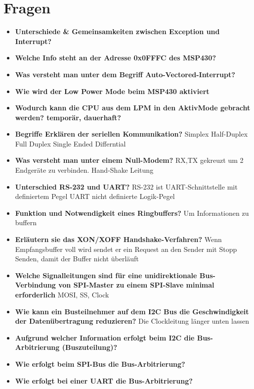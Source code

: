 \section{Fragen}
\begin{itemize}
	\item \textbf{Unterschiede \& Gemeinsamkeiten zwischen Exception und Interrupt?}
	
	\item \textbf{Welche Info steht an der Adresse 0x0FFFC des MSP430?}
	
	\item \textbf{Was versteht man unter dem Begriff Auto-Vectored-Interrupt?}
	
	\item \textbf{Wie wird der Low Power Mode beim MSP430 aktiviert}
	
	\item \textbf{Wodurch kann die CPU aus dem LPM in den AktivMode gebracht werden? temporär, dauerhaft?}
	
	\item \textbf{Begriffe Erklären der seriellen Kommunikation?}
	\subitem Simplex
	\subitem Half-Duplex
	\subitem Full Duplex
	\subitem Single Ended
	\subitem Differntial
	
	\item \textbf{Was versteht man unter einem Null-Modem?}
	\subitem RX,TX gekreuzt um 2 Endgeräte zu verbinden. Hand-Shake Leitung
	
	\item \textbf{Unterschied RS-232 und UART?}
	\subitem RS-232 ist UART-Schnittstelle mit definiertem Pegel
	\subitem UART nicht definierte Logik-Pegel
	
	\item \textbf{Funktion und Notwendigkeit eines Ringbuffers?}
	\subitem Um Informationen zu buffern
	
	\item \textbf{Erläutern sie das XON/XOFF Handshake-Verfahren?}
	\subitem Wenn Empfangsbuffer voll wird sendet er ein Request an den Sender mit Stopp Senden, damit der Buffer nicht überläuft
	
	\item \textbf{Welche Signalleitungen sind für eine unidirektionale Bus-Verbindung von SPI-Master zu einem SPI-Slave minimal erforderlich}
	\subitem MOSI, SS, Clock
	
	\item \textbf{Wie kann ein Busteilnehmer auf dem I2C Bus die Geschwindigkeit der Datenübertragung reduzieren?}
	\subitem Die Clockleitung länger unten lassen
	
	\item \textbf{Aufgrund welcher Information erfolgt beim I2C die Bus-Arbitrierung (Buszuteilung)?}
	\subitem 
	
	\item \textbf{Wie erfolgt beim SPI-Bus die Bus-Arbitrierung?}
	\subitem 
	
	\item \textbf{Wie erfolgt bei einer UART die Bus-Arbitrierung?}
	\subitem
\end{itemize}




















